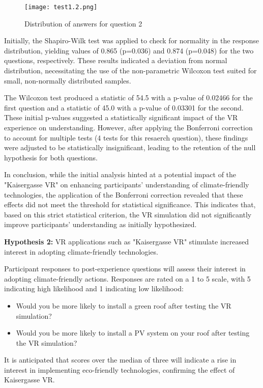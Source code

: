\documentclass[draft, final]{vutinfth} %
\begin{document}
\begin{figure}[h]
  \centering
  \texttt{[image: test1.2.png]}
  \caption[Distribution of answers for question 1.2]{Distribution of answers for question 2}
  \label{fig:analysis-image2}
\end{figure}

Initially, the Shapiro-Wilk test was applied to check for normality in the response distribution, yielding values of 0.865 (p=0.036) and 0.874 (p=0.048) for the two questions, respectively. These results indicated a deviation from normal distribution, necessitating the use of the non-parametric Wilcoxon test suited for small, non-normally distributed samples.

The Wilcoxon test produced a statistic of 54.5 with a p-value of 0.02466 for the first question and a statistic of 45.0 with a p-value of 0.03301 for the second. These initial p-values suggested a statistically significant impact of the VR experience on understanding. However, after applying the Bonferroni correction to account for multiple tests (4 tests for this resaerch question), these findings were adjusted to be statistically insignificant, leading to the retention of the null hypothesis for both questions.

In conclusion, while the initial analysis hinted at a potential impact of the "Kaisergasse VR" on enhancing participants' understanding of climate-friendly technologies, the application of the Bonferroni correction revealed that these effects did not meet the threshold for statistical significance. This indicates that, based on this strict statistical criterion, the VR simulation did not significantly improve participants' understanding as initially hypothesized.

\textbf{Hypothesis 2:} VR applications such as "Kaisergasse VR" stimulate increased interest in adopting climate-friendly technologies.

Participant responses to post-experience questions will assess their interest in adopting climate-friendly actions. Responses are rated on a 1 to 5 scale, with 5 indicating high likelihood and 1 indicating low likelihood:
\begin{itemize}
\item Would you be more likely to install a green roof after testing the VR simulation?
\item Would you be more likely to install a PV system on your roof after testing the VR simulation?
\end{itemize}
It is anticipated that scores over the median of three will indicate a rise in interest in implementing eco-friendly technologies, confirming the effect of Kaisergasse VR.
\end{document}
